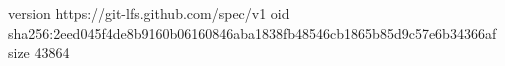 version https://git-lfs.github.com/spec/v1
oid sha256:2eed045f4de8b9160b06160846aba1838fb48546cb1865b85d9c57e6b34366af
size 43864
